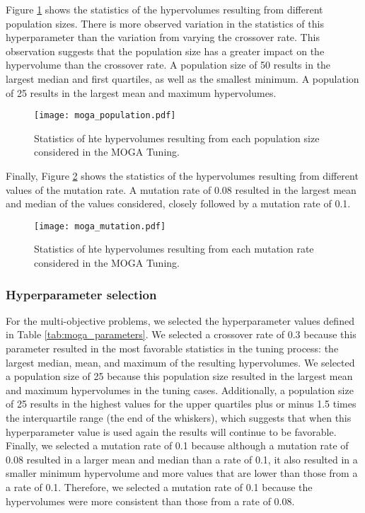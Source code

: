 Figure \ref{fig:moga_population} shows the statistics of the hypervolumes 
resulting from different population sizes. There is more observed variation 
in the statistics of this hyperparameter than the variation from varying 
the crossover rate. This observation suggests that the population size has 
a greater impact on the hypervolume than the crossover rate. A population 
size of 50 results in the largest median and first quartiles, as well 
as the smallest minimum. A population of 25 results in the largest mean 
and maximum hypervolumes. 

\begin{figure}
    \centering 
    \texttt{[image: moga\_population.pdf]}
    \caption{Statistics of hte hypervolumes resulting from 
    each population size considered in the MOGA Tuning.}
    \label{fig:moga_population}
\end{figure}

Finally, Figure \ref{fig:moga_mutation} shows the statistics of the 
hypervolumes resulting from different values of the mutation rate.
A mutation rate of 0.08 resulted in the largest mean and median of the 
values considered, closely followed by a mutation rate of 0.1. 


\begin{figure}
    \centering 
    \texttt{[image: moga\_mutation.pdf]}
    \caption{Statistics of hte hypervolumes resulting from 
    each mutation rate considered in the MOGA Tuning.}
    \label{fig:moga_mutation}
\end{figure}

\subsubsection{Hyperparameter selection}
For the multi-objective problems, we selected the hyperparameter 
values defined in Table \ref{tab:moga_parameters}. We selected 
a crossover rate of 0.3 because this parameter resulted in the 
most favorable statistics in the tuning process: the largest 
median, mean, and maximum of the resulting hypervolumes. We selected 
a population size of 25 because this population size resulted in 
the largest mean and maximum hypervolumes in the tuning cases. 
Additionally, a population size of 25 results in the highest 
values for the upper quartiles plus or minus 1.5 times the interquartile 
range (the end of the whiskers), which suggests that when this 
hyperparameter value is used again the results will continue to be 
favorable. Finally, we selected a mutation rate of 0.1 because 
although a mutation rate of 0.08 resulted in a larger mean and median 
than a rate of 0.1, it also resulted in a smaller minimum hypervolume and 
more values that are lower than those from a a rate of 0.1. Therefore, we 
selected a mutation rate of 0.1 because the hypervolumes were more 
consistent than those from a rate of 0.08. 

